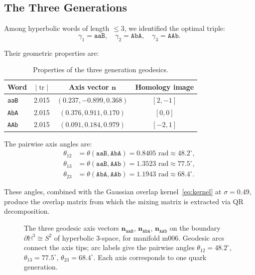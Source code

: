 \documentclass[11pt,a4paper]{article}
\newcommand{\tr}{\operatorname{tr}}
\begin{document}
\subsection{The Three Generations}
\label{subsec:generations}

Among hyperbolic words of length $\leq 3$, we identified the optimal 
triple:
\begin{equation}
\gamma_1 = \texttt{aaB}, \quad 
\gamma_2 = \texttt{AbA}, \quad 
\gamma_3 = \texttt{AAb}.
\end{equation}

Their geometric properties are:

\begin{table}[h]
\centering
\begin{tabular}{lccc}
\toprule
Word & $|\tr|$ & Axis vector $\mathbf{n}$ & Homology image \\
\midrule
\texttt{aaB} & 2.015 & $(0.237, -0.899, 0.368)$ & $[2, -1]$ \\
\texttt{AbA} & 2.015 & $(0.376, 0.911, 0.170)$ & $[0, 0]$ \\
\texttt{AAb} & 2.015 & $(0.091, 0.184, 0.979)$ & $[-2, 1]$ \\
\bottomrule
\end{tabular}
\caption{Properties of the three generation geodesics.}
\label{tab:generations}
\end{table}

The pairwise axis angles are:
\begin{align}
\theta_{12} &= \theta(\texttt{aaB}, \texttt{AbA}) = 0.8405 \text{ rad} \approx 48.2^\circ, \\
\theta_{13} &= \theta(\texttt{aaB}, \texttt{AAb}) = 1.3523 \text{ rad} \approx 77.5^\circ, \\
\theta_{23} &= \theta(\texttt{AbA}, \texttt{AAb}) = 1.1943 \text{ rad} \approx 68.4^\circ.
\end{align}

These angles, combined with the Gaussian overlap kernel~\eqref{eq:kernel} at
$\sigma = 0.49$, produce the overlap matrix from which the mixing
matrix is extracted via QR decomposition.

\begin{figure}[h]
\centering
\caption{The three geodesic axis vectors $\mathbf{n}_{\texttt{aaB}}$,
$\mathbf{n}_{\texttt{AbA}}$, $\mathbf{n}_{\texttt{AAb}}$ on the boundary
$\partial\mathbb{H}^3 \cong S^2$ of hyperbolic 3-space, for manifold m006.
Geodesic arcs connect the axis tips; arc labels give the pairwise angles
$\theta_{12} = 48.2^\circ$, $\theta_{13} = 77.5^\circ$, $\theta_{23} = 68.4^\circ$.
Each axis corresponds to one quark generation.}
\label{fig:poincare}
\end{figure}
\end{document}
